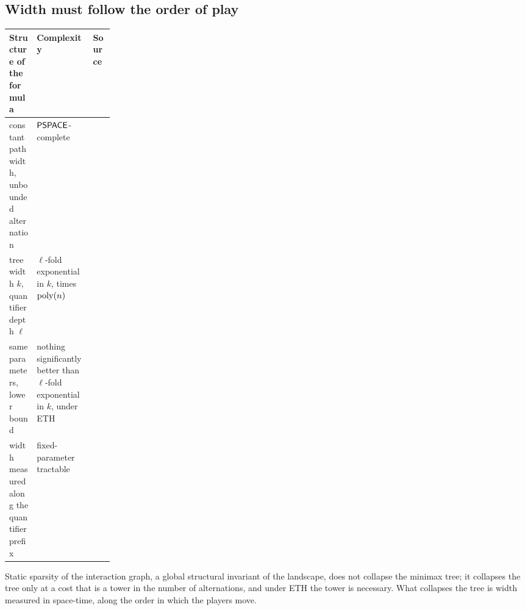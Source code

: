 \subsection{Width must follow the order of play}\label{ssec:width}
\begin{center}\small
\begin{tabularx}{\linewidth}{@{}>{\raggedright\arraybackslash}X>{\raggedright\arraybackslash}X>{\raggedright\arraybackslash}p{0.2\linewidth}@{}}
\toprule
Structure of the formula & Complexity & Source\\ \midrule
constant pathwidth, unbounded alternation & $\mathsf{PSPACE}$-complete & \cite{AtseriasOliva}\\
treewidth $k$, quantifier depth $\ell$ & $\ell$-fold exponential in $k$, times $\operatorname{poly}(n)$ & \cite{Chen04}\\
same parameters, lower bound & nothing significantly better than $\ell$-fold exponential in $k$, under ETH & \cite{FHP}\\
width measured along the quantifier prefix & fixed-parameter tractable & \cite{EGO,AtseriasOliva}\\
\bottomrule
\end{tabularx}
\end{center}
Static sparsity of the interaction graph, a global structural invariant of the landscape, does not collapse the minimax tree; it collapses the tree only at a cost that is a tower in the number of alternations, and under ETH the tower is necessary. What collapses the tree is width measured in space-time, along the order in which the players move.
